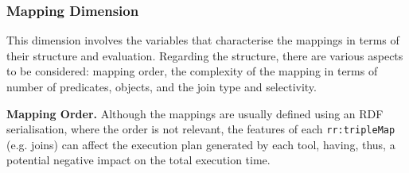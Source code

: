 \subsubsection{Mapping Dimension}
This dimension involves the variables that characterise the mappings in terms of their structure and evaluation. Regarding the structure, there are various aspects to be considered: mapping order, the complexity of the mapping in terms of number of predicates, objects, and the join type and selectivity.

\noindent \textbf{Mapping Order.} Although the mappings are usually defined using an RDF serialisation, where the order is not relevant, the features of each \texttt{rr:tripleMap} (e.g. joins) can affect the execution plan generated by each tool, having, thus, a potential negative impact on the total execution time.

